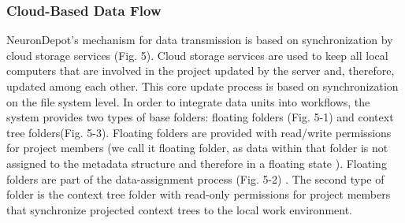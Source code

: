 \documentclass{frontiersSCNS} %
\begin{document}
\subsubsection{Cloud-Based Data Flow}

NeuronDepot's mechanism for data transmission is based on synchronization by
cloud storage services (Fig. 5). Cloud storage services are used to keep all
local computers that are involved in the project updated by the server and,
therefore, updated among each other. This core update process is based on
synchronization on the file system level. In order to integrate data units into
workflows, the system provides two types of base folders: floating folders
(Fig. 5-1) and context tree folders(Fig. 5-3). Floating folders are provided
with read/write permissions for project members (we call it floating folder, as
data within that folder is not assigned to the metadata structure and therefore
in a floating state ). Floating folders are part of the data-assignment process
(Fig. 5-2) . The second type of folder is the context tree folder with
read-only permissions for project members that synchronize projected context
trees to the local work environment.
\end{document}
